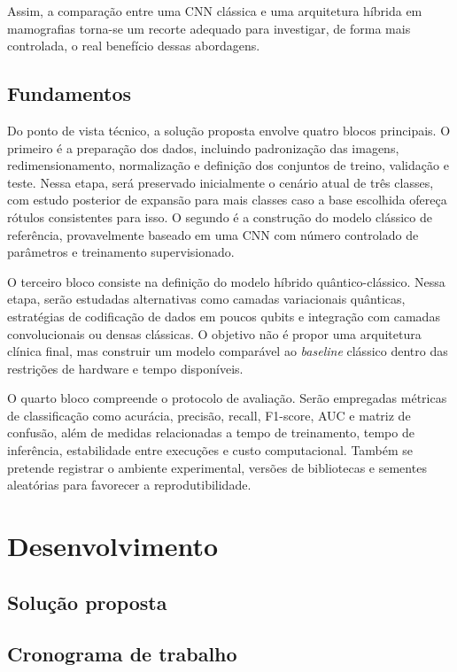 \documentclass[
    12pt,
    openright,
    oneside,
    a4paper,
    english,
    brazil
]{abntex2}
\begin{document}
Assim, a comparação entre uma CNN clássica e uma arquitetura híbrida em mamografias torna-se um recorte adequado para investigar, de forma mais controlada, o real benefício dessas abordagens.


\section{Fundamentos}
\label{sec:fundamentos}

Do ponto de vista técnico, a solução proposta envolve quatro blocos principais. O primeiro é a preparação dos dados, incluindo padronização das imagens, redimensionamento, normalização e definição dos conjuntos de treino, validação e teste. Nessa etapa, será preservado inicialmente o cenário atual de três classes, com estudo posterior de expansão para mais classes caso a base escolhida ofereça rótulos consistentes para isso. O segundo é a construção do modelo clássico de referência, provavelmente baseado em uma CNN com número controlado de parâmetros e treinamento supervisionado.

O terceiro bloco consiste na definição do modelo híbrido quântico-clássico. Nessa etapa, serão estudadas alternativas como camadas variacionais quânticas, estratégias de codificação de dados em poucos qubits e integração com camadas convolucionais ou densas clássicas. O objetivo não é propor uma arquitetura clínica final, mas construir um modelo comparável ao \textit{baseline} clássico dentro das restrições de hardware e tempo disponíveis.

O quarto bloco compreende o protocolo de avaliação. Serão empregadas métricas de classificação como acurácia, precisão, recall, F1-score, AUC e matriz de confusão, além de medidas relacionadas a tempo de treinamento, tempo de inferência, estabilidade entre execuções e custo computacional. Também se pretende registrar o ambiente experimental, versões de bibliotecas e sementes aleatórias para favorecer a reprodutibilidade.



\chapter{Desenvolvimento}
\label{cap:desenvolvimento}


\section{Solução proposta}
\label{sec:solucao}


\section{Cronograma de trabalho}
\label{sec:cronograma}

\postextual

\end{document}
